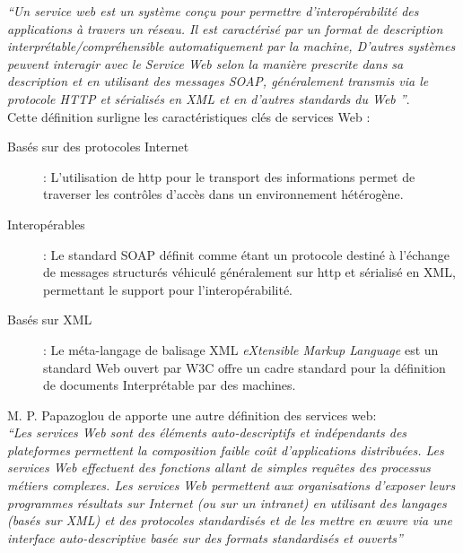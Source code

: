   \emph{``Un service web est un système conçu pour permettre
    d'interopérabilité des applications à travers un réseau.  Il est
    caractérisé par un format de description
    interprétable/compréhensible automatiquement par la machine,
    D'autres systèmes peuvent interagir avec le Service Web selon la
    manière prescrite dans sa description et en utilisant des messages
    SOAP, généralement transmis via le protocole
    HTTP et sérialisés en XML et en d'autres standards du Web ''}.\\

  Cette définition surligne les caractéristiques clés de services Web
  \cite{fremantle2002enterprise}:

  \SpecialItem
  \begin{description}
    \item[Basés sur des protocoles Internet] : L'utilisation de
      \acrshort{http} pour le transport des informations permet de
      traverser les contrôles d'accès dans un environnement hétérogène.
  
    \item[Interopérables] : Le standard \textsc{SOAP} \cite{box2000simple}
      définit comme étant un protocole destiné à l'échange de messages
      structurés véhiculé généralement sur \acrshort{http} et sérialisé en
      \textsc{XML}, permettant le support pour l'interopérabilité.
      
    \item[Basés sur XML] : Le méta-langage de balisage \textsc{XML}
      \textit{eXtensible Markup Language} est un standard Web ouvert par
      \textsc{W3C} \cite{bray1998extensible} offre un cadre standard pour
      la définition de documents Interprétable par des machines.
  \end{description}
    
  M. P. Papazoglou \cite{papazoglou2003service} de apporte une
  autre définition des services web:\\ \emph{``Les services Web sont
    des éléments auto-descriptifs et indépendants des plateformes
    permettent la composition faible coût d’applications
    distribuées. Les services Web effectuent des fonctions allant de
    simples requêtes des processus métiers complexes. Les services Web
    permettent aux organisations d’exposer leurs programmes résultats
    sur Internet (ou sur un intranet) en utilisant des langages (basés
    sur XML) et des protocoles standardisés et de les mettre en œuvre
    via une interface auto-descriptive basée sur des formats
    standardisés et ouverts''} %

